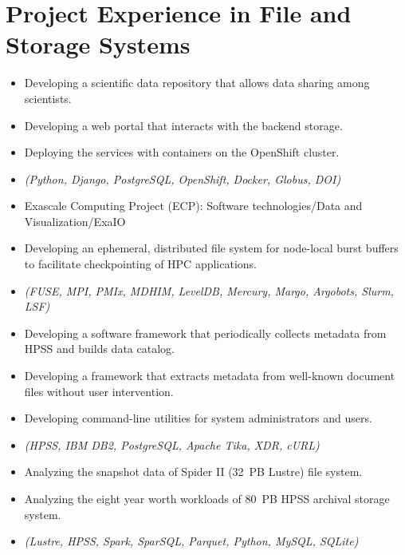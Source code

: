 \section{Project Experience in File and Storage Systems}

\begin{itemize}
 \item {Developing a scientific data repository that allows data sharing among scientists.}
 \item {Developing a web portal that interacts with the backend storage.}
 \item {Deploying the services with containers on the OpenShift cluster.}
 \item {\it\small(Python, Django, PostgreSQL, OpenShift, Docker, Globus, DOI) }
\end{itemize}

\begin{itemize}
 \item {Exascale Computing Project (ECP): Software technologies/Data and Visualization/ExaIO}
 \item {Developing an ephemeral, distributed file system for node-local burst buffers to facilitate checkpointing of HPC applications.}
 \item {\it\small (FUSE, MPI, PMIx, MDHIM, LevelDB, Mercury, Margo, Argobots, Slurm, LSF)}
\end{itemize}

\begin{itemize}
 \item {Developing a software framework that periodically collects metadata from HPSS and builds data catalog.}
 \item {Developing a framework that extracts metadata from well-known document files without user intervention.}
 \item {Developing command-line utilities for system administrators and users.}
 \item {\it\small (HPSS, IBM DB2, PostgreSQL, Apache Tika, XDR, cURL)}
\end{itemize}

\begin{itemize}
 \item {Analyzing the snapshot data of Spider II (32~PB Lustre) file system.}
 \item {Analyzing the eight year worth workloads of 80~PB HPSS archival storage system.}
 \item {\it\small (Lustre, HPSS, Spark, SparSQL, Parquet, Python, MySQL, SQLite)}
\end{itemize}

